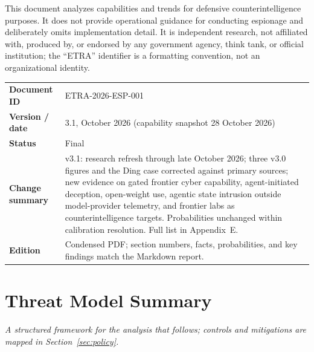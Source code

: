 \documentclass[11pt,letterpaper]{article}
\newcommand{\etraneed}[1]{\par\ifdim\pagegoal<\maxdimen\ifdim\pagetotal<\pagegoal\ifdim\dimexpr\pagegoal-\pagetotal\relax<\dimexpr#1\relax\newpage\fi\fi\fi}
\begin{document}
\etraneed{12\baselineskip}
\begin{warnbox}
This document analyzes capabilities and trends for defensive counterintelligence purposes. It does not provide operational guidance for conducting espionage and deliberately omits implementation detail. It is independent research, not affiliated with, produced by, or endorsed by any government agency, think tank, or official institution; the ``ETRA'' identifier is a formatting convention, not an organizational identity.
\end{warnbox}


\begin{defbox}
\small
\begin{tabular}{@{}L{3.2cm}L{12.4cm}@{}}
\textbf{Document ID} & ETRA-2026-ESP-001 \\
\textbf{Version / date} & 3.1, October 2026 (capability snapshot 28 October 2026) \\
\textbf{Status} & Final \\
\textbf{Change summary} & v3.1: research refresh through late October 2026; three v3.0 figures and the Ding case corrected against primary sources; new evidence on gated frontier cyber capability, agent-initiated deception, open-weight use, agentic state intrusion outside model-provider telemetry, and frontier labs as counterintelligence targets. Probabilities unchanged within calibration resolution. Full list in Appendix~E. \\
\textbf{Edition} & Condensed PDF; section numbers, facts, probabilities, and key findings match the Markdown report. \\
\end{tabular}
\end{defbox}



\newpage
\tableofcontents
\vspace{1em}

\section*{Threat Model Summary}\label{sec:threatmodel}

\textit{A structured framework for the analysis that follows; controls and mitigations are mapped in Section~\ref{sec:policy}.}
\end{document}
